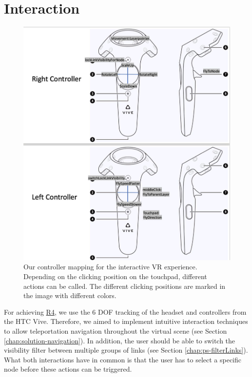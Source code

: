 \section{Interaction}
\label{chap:solution-interaction}

\begin{figure}[b]
    \centering
    \includegraphics[width=1\textwidth]{graphics/controllerMapping.jpg}
    \caption[Our controller mapping for the interactive VR experience.]{Our controller mapping for the interactive VR experience. Depending on the clicking position on the touchpad, different actions can be called. The different clicking positions are marked in the image with different colors.} 
    \label{fig:controllerMapping} 
\end{figure}
For achieving \hyperref[req:R4]{R4}, we use the 6 DOF tracking of the headset and controllers from the HTC Vive. Therefore, we aimed to implement intuitive interaction techniques to allow teleportation navigation throughout the virtual scene (see Section \ref{chap:solution-navigation}). In addition, the user should be able  to switch the visibility filter between multiple groups of links (see Section \ref{chap:ps-filterLinks}).
What both interactions have in common is that the user has to select a specific node before these actions can be triggered. 

